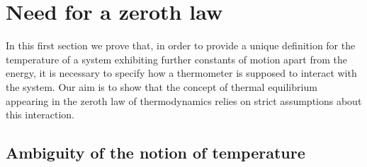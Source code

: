 \documentclass[twocolumn,usenatbib]{mnras2}
\begin{document}
%
%


\section{Need for a zeroth law}\label{neeeeeed}

In this first section we prove that, in order to provide a unique definition for the temperature of a system exhibiting further constants of motion apart from the energy, it is necessary to specify how a thermometer is supposed to interact with the system. Our aim is to show that the concept of thermal equilibrium appearing in the zeroth law of thermodynamics relies on strict assumptions about this interaction. 



\subsection{Ambiguity of the notion of temperature}\label{ambiguo}
\end{document}
